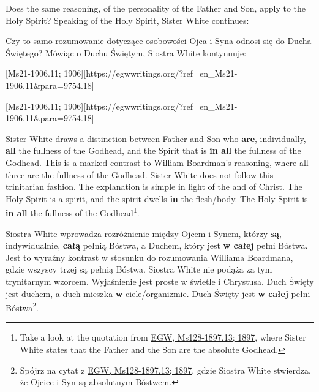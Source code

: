Does the same reasoning, of the personality of the Father and Son, apply to the Holy Spirit? Speaking of the Holy Spirit, Sister White continues:


Czy to samo rozumowanie dotyczące osobowości Ojca i Syna odnosi się do Ducha Świętego? Mówiąc o Duchu Świętym, Siostra White kontynuuje:


[Ms21-1906.11; 1906][https://egwwritings.org/?ref=en\_Ms21-1906.11&para=9754.18]


[Ms21-1906.11; 1906][https://egwwritings.org/?ref=en\_Ms21-1906.11&para=9754.18]


Sister White draws a distinction between Father and Son who \textbf{are}, individually, \textbf{all }the fullness of the Godhead, and the Spirit that is \textbf{in all }the fullness of the Godhead. This is a marked contrast to William Boardman’s reasoning, where all three are the fullness of the Godhead. Sister White does not follow this trinitarian fashion. The explanation is simple in light of the  and of Christ. The Holy Spirit is a spirit, and the spirit dwells \textbf{in} the flesh/body. The Holy Spirit is \textbf{in all} the fullness of the Godhead\footnote{Take a look at the quotation from \href{https://egwwritings.org/?ref=en_Ms128-1897.13&para=5426.19}{{EGW, Ms128-1897.13; 1897}}, where Sister White states that the Father and the Son are the absolute Godhead.}.


Siostra White wprowadza rozróżnienie między Ojcem i Synem, którzy \textbf{są}, indywidualnie, \textbf{całą} pełnią Bóstwa, a Duchem, który jest \textbf{w całej} pełni Bóstwa. Jest to wyraźny kontrast w stosunku do rozumowania Williama Boardmana, gdzie wszyscy trzej są pełnią Bóstwa. Siostra White nie podąża za tym trynitarnym wzorcem. Wyjaśnienie jest proste w świetle  i Chrystusa. Duch Święty jest duchem, a duch mieszka \textbf{w} ciele/organizmie. Duch Święty jest \textbf{w całej} pełni Bóstwa\footnote{Spójrz na cytat z \href{https://egwwritings.org/?ref=en_Ms128-1897.13&para=5426.19}{{EGW, Ms128-1897.13; 1897}}, gdzie Siostra White stwierdza, że Ojciec i Syn są absolutnym Bóstwem.}.



